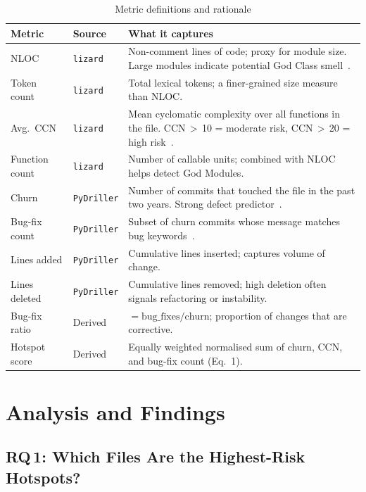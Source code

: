 \documentclass[12pt,a4paper]{article}
\begin{document}
\begin{table}[!htb]
\centering
\footnotesize
\caption{Metric definitions and rationale}
\label{tab:metric_defs}
\begin{tabularx}{\textwidth}{l l X}
\toprule
\textbf{Metric} & \textbf{Source} & \textbf{What it captures} \\
\midrule
NLOC             & \texttt{lizard}     & Non-comment lines of code; proxy for module size. Large modules indicate potential God Class smell~\cite{fowlerbeck1999}. \\
Token count      & \texttt{lizard}     & Total lexical tokens; a finer-grained size measure than NLOC. \\
Avg.\ CCN        & \texttt{lizard}     & Mean cyclomatic complexity over all functions in the file. CCN\,$>$\,10 = moderate risk, CCN\,$>$\,20 = high risk~\cite{mccabe1976}. \\
Function count   & \texttt{lizard}     & Number of callable units; combined with NLOC helps detect God Modules. \\
Churn            & \texttt{PyDriller}  & Number of commits that touched the file in the past two years. Strong defect predictor~\cite{nagappan2005}. \\
Bug-fix count    & \texttt{PyDriller}  & Subset of churn commits whose message matches bug keywords~\cite{mockus2000}. \\
Lines added      & \texttt{PyDriller}  & Cumulative lines inserted; captures volume of change. \\
Lines deleted    & \texttt{PyDriller}  & Cumulative lines removed; high deletion often signals refactoring or instability. \\
Bug-fix ratio    & Derived             & $= \text{bug\_fixes}/\text{churn}$; proportion of changes that are corrective. \\
Hotspot score    & Derived             & Equally weighted normalised sum of churn, CCN, and bug-fix count (Eq.~1). \\
\bottomrule
\end{tabularx}
\end{table}

\FloatBarrier
\section{Analysis and Findings}
\label{sec:findings}

\subsection{\texorpdfstring{RQ\,1}{RQ 1}: Which Files Are the Highest-Risk Hotspots?}
\end{document}
